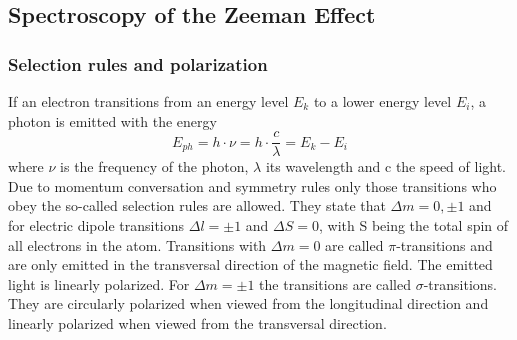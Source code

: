 \documentclass[12pt]{article}
\begin{document}
\subsection{Spectroscopy of the Zeeman Effect}
\subsubsection{Selection rules and polarization}
If an electron transitions from an energy level $E_k$ to a lower energy level $E_i$, a photon is emitted with the energy
\begin{equation}
E_{ph}=h \cdot \nu=h \cdot \frac{c}{\lambda}=E_k-E_i
\label{eq:photonenergy}
\end{equation}
where $\nu$ is the frequency of the photon, $\lambda$ its wavelength and c the speed of light. Due to momentum conversation and symmetry rules only those transitions who obey the so-called selection rules are allowed. They state that $\Delta m=0,\pm1$ and for electric dipole transitions $\Delta l=\pm1$ and $\Delta S=0$, with S being the total spin of all electrons in the atom. Transitions with $\Delta m=0$ are called $\pi$-transitions and are only emitted in the transversal direction of the magnetic field. The emitted light is linearly polarized. For $\Delta m=\pm1$ the transitions are called $\sigma$-transitions. They are circularly polarized when viewed from the longitudinal direction and linearly polarized when viewed from the transversal direction.
\end{document}
